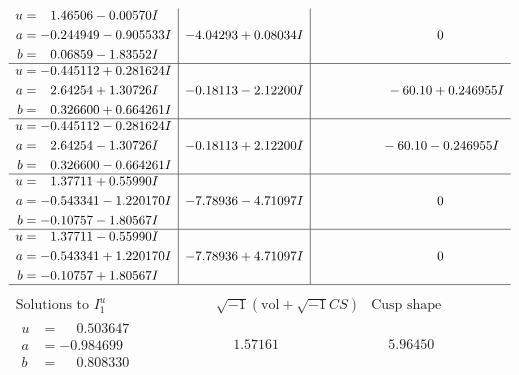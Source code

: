 \documentclass[1p]{elsarticle_modified}
\theoremstyle{definition}
\newcommand{\I}{\sqrt{-1}}
\begin{document}
$$\begin{array}{c|c|c}
\begin{aligned}
u &= \phantom{-}1.46506 - 0.00570 I \\
a &= -0.244949 - 0.905533 I \\
b &= \phantom{-}0.06859 - 1.83552 I\end{aligned}
 & -4.04293 + 0.08034 I & \phantom{-0.000000 } 0 \\ \hline\begin{aligned}
u &= -0.445112 + 0.281624 I \\
a &= \phantom{-}2.64254 + 1.30726 I \\
b &= \phantom{-}0.326600 + 0.664261 I\end{aligned}
 & -0.18113 - 2.12200 I & \phantom{-0.000000 -}     -6
0. 10   + 0.246955 I \\ \hline\begin{aligned}
u &= -0.445112 - 0.281624 I \\
a &= \phantom{-}2.64254 - 1.30726 I \\
b &= \phantom{-}0.326600 - 0.664261 I\end{aligned}
 & -0.18113 + 2.12200 I & \phantom{-0.000000 }      -6
0. 10   - 0.246955 I \\ \hline\begin{aligned}
u &= \phantom{-}1.37711 + 0.55990 I \\
a &= -0.543341 - 1.220170 I \\
b &= -0.10757 - 1.80567 I\end{aligned}
 & -7.78936 - 4.71097 I & \phantom{-0.000000 } 0 \\ \hline\begin{aligned}
u &= \phantom{-}1.37711 - 0.55990 I \\
a &= -0.543341 + 1.220170 I \\
b &= -0.10757 + 1.80567 I\end{aligned}
 & -7.78936 + 4.71097 I & \phantom{-0.000000 } 0\\
 \hline 
 \end{array}$$\newpage$$\begin{array}{c|c|c}  
\text{Solutions to }I^u_{1}& \I (\text{vol} + \sqrt{-1}CS) & \text{Cusp shape}\\
 \hline 
\begin{aligned}
u &= \phantom{-}0.503647\phantom{ +0.000000I} \\
a &= -0.984699\phantom{ +0.000000I} \\
b &= \phantom{-}0.808330\phantom{ +0.000000I}\end{aligned}
 & \phantom{-}1.57161\phantom{ +0.000000I} & \phantom{-}5.96450\phantom{ +0.000000I} \\ \hline\begin{aligned}

\end{aligned}
\end{array}$$
\end{document}
